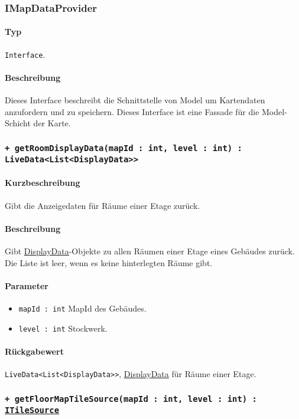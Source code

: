 \subsubsection{IMapDataProvider}\label{App_Map_Model_IMapDataProvider}
\paragraph*{Typ}
\texttt{Interface}.
\paragraph*{Beschreibung}
Dieses Interface beschreibt die Schnittstelle von Model um Kartendaten anzufordern und zu speichern.
Dieses Interface ist eine Fassade für die Model-Schicht der Karte.

\subsubsection*{\texttt{+ getRoomDisplayData(mapId : int, level : int) : LiveData<List<DisplayData>>}}\label{App_Map_Model_getRoomDisplayData_IMap}%
\paragraph*{Kurzbeschreibung}
Gibt die Anzeigedaten für Räume einer Etage zurück.
\paragraph*{Beschreibung}
Gibt \hyperref[App_Map_Util_DisplayData]{DisplayData}-Objekte zu allen Räumen einer Etage eines Gebäudes zurück.\\
Die Liste ist leer, wenn es keine hinterlegten Räume gibt.
\paragraph*{Parameter}
\begin{itemize}
    \item \texttt{mapId : int} MapId des Gebäudes.
    \item \texttt{level : int} Stockwerk.
\end{itemize}
\paragraph*{Rückgabewert}
\texttt{LiveData<List<DisplayData>>}, \hyperref[App_Map_Util_DisplayData]{DisplayData} für Räume einer Etage.

\subsubsection*{\texttt{+ getFloorMapTileSource(mapId : int, level : int) : \href{https://osmdroid.github.io/osmdroid/javadocAll/org/osmdroid/tileprovider/tilesource/ITileSource.html}
{ITileSource}}}\label{App_Map_Model_getFloorMapTileSource_IMap}%
